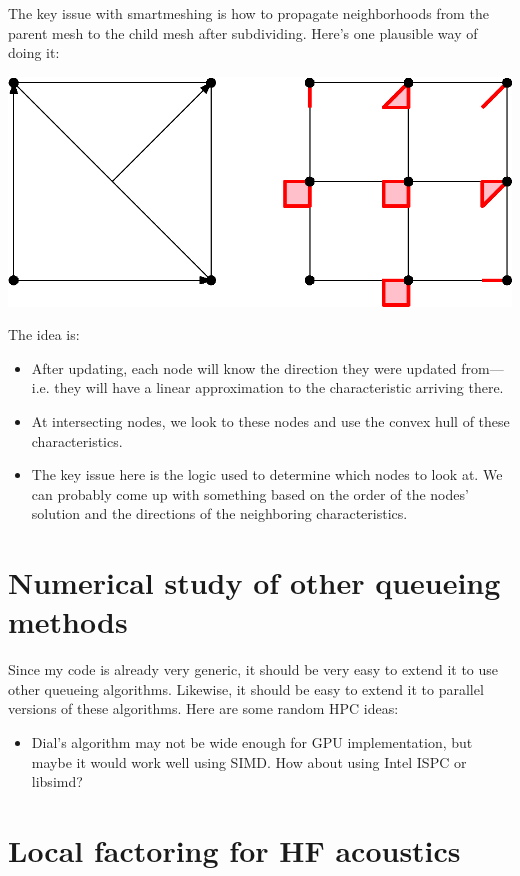 \documentclass[eikonal.tex]{subfiles}
\begin{document}
The key issue with smartmeshing is how to propagate neighborhoods from
the parent mesh to the child mesh after subdividing. Here's one
plausible way of doing it:
\begin{center}
  \includegraphics{recursive-neighborhoods.eps}
\end{center}
The idea is:
\begin{itemize}
\item After updating, each node will know the direction they were
  updated from---i.e. they will have a linear approximation to the
  characteristic arriving there. 
\item At intersecting nodes, we look to
  these nodes and use the convex hull of these characteristics.
\item The key issue here is the logic used to determine which nodes to
  look at. We can probably come up with something based on the order
  of the nodes' solution and the directions of the neighboring
  characteristics.
\end{itemize}

\section{Numerical study of other queueing methods}

Since my code is already very generic, it should be very easy to
extend it to use other queueing algorithms. Likewise, it should be
easy to extend it to parallel versions of these algorithms. Here are
some random HPC ideas:
\begin{itemize}
\item Dial's algorithm may not be wide enough for GPU implementation,
  but maybe it would work well using SIMD. How about using Intel ISPC
  or libsimd?
\end{itemize}

\section{Local factoring for HF acoustics}
\end{document}
